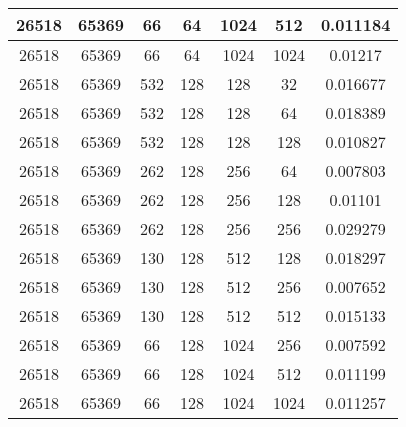 \documentclass[9pt]{article}
\begin{document}
\begin{tabular}{|c|c|c|c|c|c|c| }
26518  & 65369  & 66  & 64  & 1024  & 512  & 0.011184 \\
\hline
26518  & 65369  & 66  & 64  & 1024  & 1024  & 0.01217 \\
\hline
26518  & 65369  & 532  & 128  & 128  & 32  & 0.016677 \\
\hline
26518  & 65369  & 532  & 128  & 128  & 64  & 0.018389 \\
\hline
26518  & 65369  & 532  & 128  & 128  & 128  & 0.010827 \\
\hline
26518  & 65369  & 262  & 128  & 256  & 64  & 0.007803 \\
\hline
26518  & 65369  & 262  & 128  & 256  & 128  & 0.01101 \\
\hline
26518  & 65369  & 262  & 128  & 256  & 256  & 0.029279 \\
\hline
26518  & 65369  & 130  & 128  & 512  & 128  & 0.018297 \\
\hline
26518  & 65369  & 130  & 128  & 512  & 256  & 0.007652 \\
\hline
26518  & 65369  & 130  & 128  & 512  & 512  & 0.015133 \\
\hline
26518  & 65369  & 66  & 128  & 1024  & 256  & 0.007592 \\
\hline
26518  & 65369  & 66  & 128  & 1024  & 512  & 0.011199 \\
\hline
26518  & 65369  & 66  & 128  & 1024  & 1024  & 0.011257 \\
\hline
\end{tabular}
 
\end{document}
